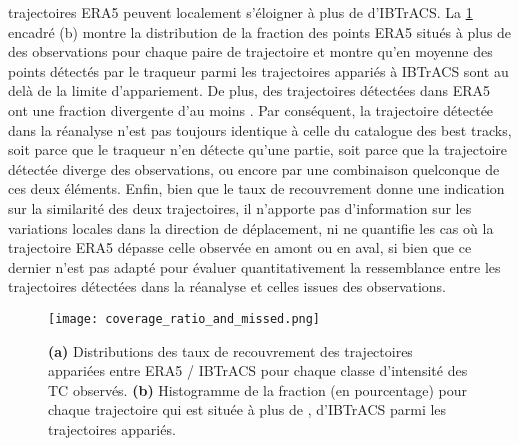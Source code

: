 \documentclass[../main.tex]{subfiles}
\begin{document}
trajectoires ERA5 peuvent localement s'éloigner à plus de  d'IBTrACS. La \cref{fig:coverage_ratio} encadré (b) montre la distribution de la fraction des
points ERA5 situés à plus de  des observations pour chaque paire de trajectoire et montre qu'en moyenne  des points détectés par le traqueur
parmi les trajectoires appariés à IBTrACS sont au delà de la limite d'appariement. De plus,  des trajectoires détectées dans ERA5 ont une fraction
divergente d'au moins . Par conséquent, la trajectoire détectée dans la réanalyse n'est pas toujours identique à celle du catalogue des best tracks,
soit parce que le traqueur n'en détecte qu'une partie, soit parce que la trajectoire détectée diverge des observations, ou encore par une combinaison quelconque
de ces deux éléments. Enfin, bien que le taux de recouvrement donne une indication sur la similarité des deux trajectoires, il n'apporte pas d'information sur
les variations locales dans la direction de déplacement, ni ne quantifie les cas où la trajectoire ERA5 dépasse celle observée en amont ou en aval, si bien que
ce dernier n'est pas adapté pour évaluer quantitativement la ressemblance entre les trajectoires détectées dans la réanalyse et celles issues des observations.

\begin{figure}[tb]
    \centering
    \texttt{[image: coverage\_ratio\_and\_missed.png]}
    \caption{\textbf{(a)} Distributions des taux de recouvrement des trajectoires appariées entre ERA5 / IBTrACS pour chaque classe d'intensité des TC observés.
    \textbf{(b)} Histogramme de la fraction (en pourcentage) pour chaque trajectoire qui est située à plus de , d'IBTrACS parmi les trajectoires appariés.}
    \label{fig:coverage_ratio}
\end{figure}
\end{document}

